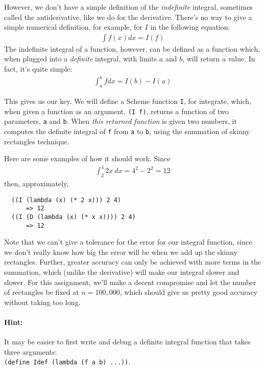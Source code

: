 \documentclass{article}
\begin{document}
\begin{multicols}{2}
However, we don't have a simple definition of the {\em indefinite}
integral, sometimes called the antiderivative, like we do for the
derivative.  There's no way to give a simple numerical definition, for
example, for $I$ in the following equation:
\begin{eqnarray}
\int f(x) dx = I(f)
\end{eqnarray}
The indefinite integral of a function,
however, can be defined as a function which, when plugged into a {\em
  definite} integral, with limits $a$ and $b$, will return a value.
In fact, it's quite simple:
\begin{eqnarray}
\int_a^b f dx  =  I(b) - I(a)
\end{eqnarray}

This gives us our key.  We will define a Scheme function {\tt I}, for
integrate, which, when given a function as an argument, {\tt (I f)},
returns a function of two parameters, {\tt a} and {\tt b}.  When
{\em this returned function} is given two numbers, it computes the definite
integral of {\tt f} from {\tt a} to {\tt b}, using the summation of
skinny rectangles technique.

Here are some examples of how it should work.  Since
\begin{eqnarray}
  \int_2^4 2x\ dx = 4^2 - 2^2 = 12
\end{eqnarray}
then, approximately,
\begin{Verbatim}
  ((I (lambda (x) (* 2 x))) 2 4)
      => 12
  ((I (D (lambda (x) (* x x)))) 2 4)
      => 12
\end{Verbatim}

Note that we can't give a tolerance for the error for our integral
function, since we don't really know how big the error will be when we
add up the skinny rectangles.  Further, greater accuracy can only be
achieved with more terms in the summation, which (unlike the
derivative) will make our integral slower and slower.  For this
assignment, we'll make a decent compromise and let the number of
rectangles be fixed at $n=100,000$, which should give us pretty good
accuracy without taking too long.

\paragraph{Hint:} It may be easier to first write and debug
a definite integral
function that takes three arguments:\\
{\tt (define Idef (lambda (f a b) ...))}.
\end{multicols}
\end{document}
